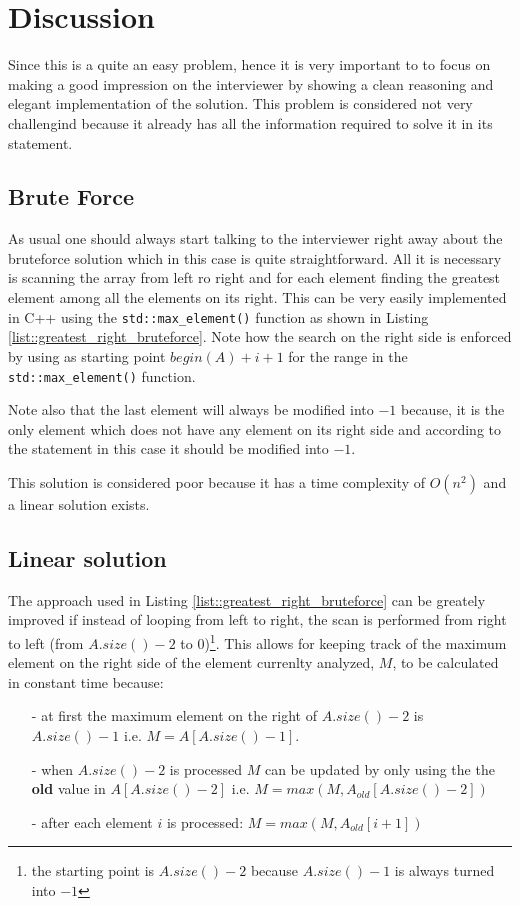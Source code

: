 \section{Discussion}
Since this is a quite an easy problem, hence it is very important to  to focus on making a good impression on the interviewer by showing a clean reasoning and elegant implementation of the solution. This problem is considered not very challengind because it already has all the information required to solve it in its statement. 

\subsection{Brute Force}
As usual one should always start talking to the interviewer right away about the bruteforce solution which in this case is quite straightforward. All it is necessary is scanning the array from left ro right and for each element finding the greatest element among all the elements on its right.
This can be very easily implemented in C++ using the \texttt{std::max\_element()} function as shown in Listing \ref{list::greatest_right_bruteforce}. Note how the search on the right side is enforced by using as starting point $begin(A)+i+1$ for the range in the \texttt{std::max\_element()} function.

	



Note also that the last element will always be modified into $-1$ because, it is the only element which does not have any element on its right side and according to the statement in this case it should be modified into $-1$.

This solution is considered poor because it has a time complexity of $O(n^2)$ and a linear solution exists. 

\subsection{Linear solution}
The approach used in Listing \ref{list::greatest_right_bruteforce} can be greately improved if instead of looping from left to right, the scan is performed from right to left (from $A.size()-2$ to $0$)\footnote{the starting point is $A.size()-2$ because $A.size()-1$ is always turned into $-1$}. This allows for keeping track of the maximum element on the right  side of the element currenlty analyzed, $M$, to be calculated in constant time because:
\begin{itemize}
	\item[-] at first the maximum element on the right of $A.size()-2$ is $A.size()-1$ i.e. $M = A[A.size()-1]$.
	\item[-] when $A.size()-2$ is processed $M$ can be updated by only using the the \textbf{old} value in $A[A.size()-2]$ i.e. $M= max(M, A_{old}[A.size()-2])$
	\item[-] after each element $i$ is processed: $M= max(M, A_{old}[i+1])$
\end{itemize}

